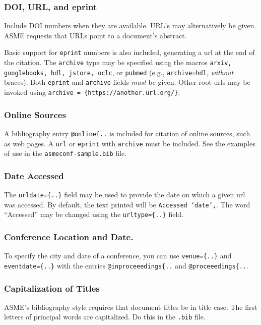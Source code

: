 \documentclass[captionpatch,colorlinks,upint,subscriptcorrection,varvw,german]{asmeconf}
\begin{document}
\subsubsection*{DOI, URL, and eprint} Include DOI numbers when they are available.  URL's may alternatively be given. ASME requests that URLs point to a document's abstract.

Basic support for \texttt{eprint} numbers is also included, generating a url at the end of the citation. The \texttt{archive} type may be specified using the macros \texttt{arxiv, google\-books, hdl, jstore, oclc}, or \texttt{pubmed} (e.g., \texttt{archive=hdl},  \textit{without} braces). Both \texttt{eprint} and \texttt{archive} fields \textit{must} be given. Other root urls may be invoked using \verb|archive = {https://another.url.org/}|.

\subsubsection*{Online Sources} A bibliography entry \verb|@online{..| is included for citation of online sources, such as web pages. A \texttt{url} or \texttt{eprint} with \texttt{archive} must be included. See the examples of use in the \texttt{asmeconf-sample.bib} file. 

\subsubsection*{Date Accessed} The \verb|urldate={..}| field may be used to provide the date on which a given url was accessed. By default, the text printed will be \texttt{Accessed `date',}. The word ``Accessed'' may be changed using the \verb|urltype={..}| field.

\subsubsection*{Conference Location and Date.} To specify the city and date of a conference, you can use \verb|venue={..}| and \verb|eventdate={..}| with the entries \verb|@inproceeedings{..| and \verb|@proceeedings{..|.

\subsubsection*{Capitalization of Titles} ASME's bibliography style requires that document titles be in title case. The first letters of principal words are capitalized. Do this in the \texttt{.bib} file.
\end{document}
